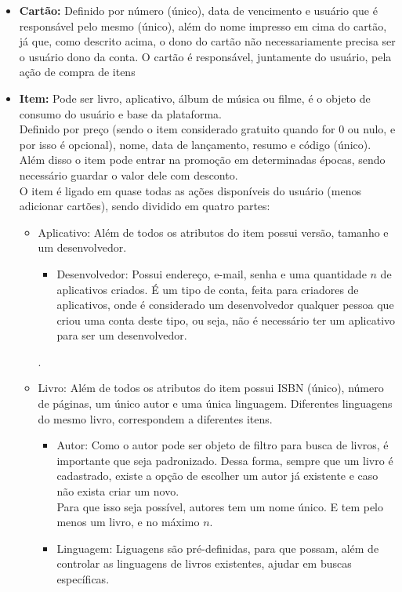 \documentclass[a4paper, 11pt]{article}
\begin{document}
\begin{itemize}
\begin{itemize}
    \end{itemize}.
    \item \textbf{Cartão:} Definido por número (único), data de vencimento e usuário que é responsável pelo mesmo (único), além do nome impresso em cima do cartão, já que, como descrito acima, o dono do cartão não necessariamente precisa ser o usuário dono da conta. O cartão é responsável, juntamente do usuário, pela ação de compra de itens
    \item \textbf{Item:} Pode ser livro, aplicativo, álbum de música ou filme, é o objeto de consumo do usuário e base da plataforma.\\
    Definido por preço (sendo o item considerado gratuito quando for 0 ou nulo, e por isso é opcional), nome, data de lançamento, resumo e código (único). Além disso o item pode entrar na promoção em determinadas épocas, sendo necessário guardar o valor dele com desconto. \\
    O item é ligado em quase todas as ações disponíveis do usuário (menos adicionar cartões), sendo dividido em quatro partes:
    \begin{itemize}
        \item Aplicativo: Além de todos os atributos do item possui versão, tamanho e um desenvolvedor. 
         \begin{itemize}
            \item Desenvolvedor: Possui endereço, e-mail, senha e uma quantidade $n$ de aplicativos criados. É um tipo de conta, feita para criadores de aplicativos, onde é considerado um desenvolvedor qualquer pessoa que criou uma conta deste tipo, ou seja, não é necessário ter um aplicativo para ser um desenvolvedor.
         \end{itemize}.
        \item Livro: Além de todos os atributos do item possui ISBN\cite{ISBN} (único), número de páginas, um único autor e uma única linguagem. Diferentes linguagens do mesmo livro, correspondem a diferentes itens.
        \begin{itemize}
            \item Autor: Como o autor pode ser objeto de filtro para busca de livros, é importante que seja padronizado. Dessa forma, sempre que um livro é cadastrado, existe a opção de escolher um autor já existente e caso não exista criar um novo.\\
            Para que isso seja possível, autores tem um nome único. E tem pelo menos um livro, e no máximo $n$.
            \item Linguagem: Liguagens são pré-definidas, para que possam, além de controlar as linguagens de livros existentes, ajudar em buscas específicas.\\

\end{itemize}
\end{itemize}
\end{itemize}
\end{document}
